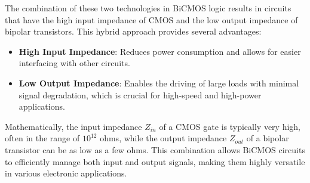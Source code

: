 The combination of these two technologies in BiCMOS logic results in circuits that have the high input impedance of CMOS and the low output impedance of bipolar transistors. This hybrid approach provides several advantages:
\begin{itemize}
    \item \textbf{High Input Impedance}: Reduces power consumption and allows for easier interfacing with other circuits.
    \item \textbf{Low Output Impedance}: Enables the driving of large loads with minimal signal degradation, which is crucial for high-speed and high-power applications.
\end{itemize}

Mathematically, the input impedance \( Z_{in} \) of a CMOS gate is typically very high, often in the range of \( 10^{12} \) ohms, while the output impedance \( Z_{out} \) of a bipolar transistor can be as low as a few ohms. This combination allows BiCMOS circuits to efficiently manage both input and output signals, making them highly versatile in various electronic applications.

